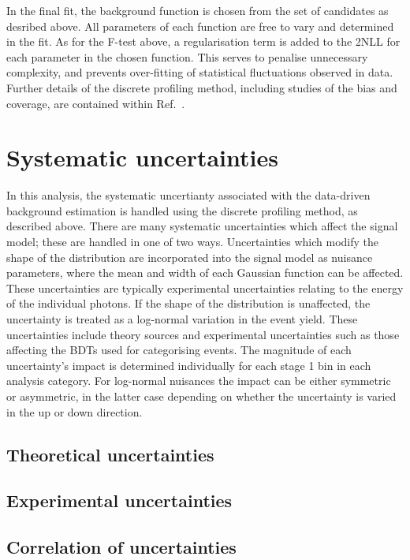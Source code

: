 In the final fit, the background function is chosen from the set of candidates as desribed above.
All parameters of each function are free to vary and determined in the fit.
As for the F-test above, 
a regularisation term is added to the 2NLL for each parameter in the chosen function.
This serves to penalise unnecessary complexity, 
and prevents over-fitting of statistical fluctuations observed in data. %
Further details of the discrete profiling method, 
including studies of the bias and coverage,
are contained within Ref.~\cite{Envelope}.

\section{Systematic uncertainties}

In this analysis, the systematic uncertianty associated with the data-driven background estimation 
is handled using the discrete profiling method, as described above.
There are many systematic uncertainties which affect the signal model; 
these are handled in one of two ways.
Uncertainties which modify the shape of the \mgg distribution are incorporated into the signal model
as nuisance parameters, where the mean and width of each Gaussian function can be affected.
These uncertainties are typically experimental uncertainties 
relating to the energy of the individual photons. 
If the shape of the \mgg distribution is unaffected, 
the uncertainty is treated as a log-normal variation in the event yield.
These uncertainties include theory sources
and experimental uncertainties such as those affecting the BDTs used for categorising events.
The magnitude of each uncertainty's impact is determined individually 
for each stage 1 bin in each analysis category.
For log-normal nuisances the impact can be either symmetric or asymmetric,
in the latter case depending on whether the uncertainty is varied in the up or down direction.

\subsection{Theoretical uncertainties}

\subsection{Experimental uncertainties}

\subsection{Correlation of uncertainties}

